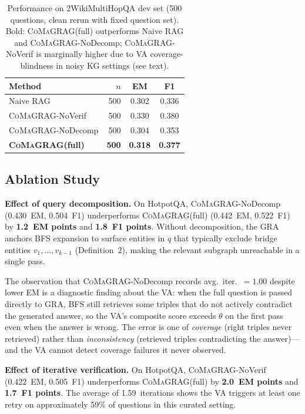 \documentclass[runningheads]{llncs}
\newcommand{\sys}{\textsc{CoMaGRAG}\xspace}
\begin{document}
\begin{table}[t]
\centering
\caption{Performance on 2WikiMultiHopQA dev set (500 questions, clean rerun
with fixed question set). Bold: \sys (full) outperforms Naive RAG and
\sys-NoDecomp; \sys-NoVerif is marginally higher due to VA coverage-blindness
in noisy KG settings (see text).}
\label{tab:2wiki}
\begin{tabular}{lrcc}
\toprule
Method & $n$ & EM & F1 \\
\midrule
Naive RAG                           & 500 & 0.302 & 0.336 \\
\sys-NoVerif                        & 500 & 0.330 & 0.380 \\
\sys-NoDecomp                       & 500 & 0.304 & 0.353 \\
\textbf{\sys (full)}                & \textbf{500} & \textbf{0.318} & \textbf{0.377} \\
\bottomrule
\end{tabular}
\end{table}

\subsection{Ablation Study}
\label{sec:ablation}

\textbf{Effect of query decomposition.} On HotpotQA, \sys-NoDecomp (0.430~EM,
0.504~F1) underperforms \sys (full) (0.442~EM, 0.522~F1) by \textbf{1.2~EM
points} and \textbf{1.8~F1 points}. Without decomposition, the GRA anchors
BFS expansion to surface entities in $q$ that typically exclude bridge entities
$v_1,\ldots,v_{k-1}$ (Definition~2), making the relevant subgraph unreachable
in a single pass.

The observation that \sys-NoDecomp records avg.\ iter.\ $=1.00$ despite lower
EM is a diagnostic finding about the VA: when the full question is passed
directly to GRA, BFS still retrieves some triples that do not actively
contradict the generated answer, so the VA's composite score exceeds $\theta$
on the first pass even when the answer is wrong. The error is one of
\emph{coverage} (right triples never retrieved) rather than
\emph{inconsistency} (retrieved triples contradicting the answer)---and the
VA cannot detect coverage failures it never observed.

\textbf{Effect of iterative verification.} On HotpotQA, \sys-NoVerif
(0.422~EM, 0.505~F1) underperforms \sys (full) by \textbf{2.0~EM points} and
\textbf{1.7~F1 points}. The average of 1.59~iterations shows the VA triggers
at least one retry on approximately 59\% of questions in this curated setting.
\end{document}
